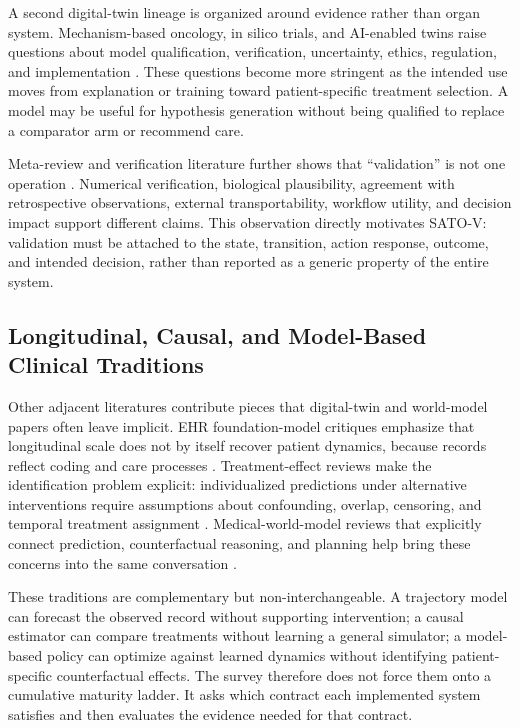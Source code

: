 A second digital-twin lineage is organized around evidence rather than organ system. Mechanism-based oncology, in silico trials, and AI-enabled twins raise questions about model qualification, verification, uncertainty, ethics, regulation, and implementation \citep{Wu2022Integratingmechanismbased,Strigari2025ComputationalNuclearOncology,Alharthi2025AIpoweredsilico,Samei2025FutureSilicoTrials}. These questions become more stringent as the intended use moves from explanation or training toward patient-specific treatment selection. A model may be useful for hypothesis generation without being qualified to replace a comparator arm or recommend care.

Meta-review and verification literature further shows that ``validation'' is not one operation \citep{Ringeval2025AdvancingHealthCare,Sel2025SurveyVerificationValidation,Glinkowski2026DigitalTwinsOrthopedics}. Numerical verification, biological plausibility, agreement with retrospective observations, external transportability, workflow utility, and decision impact support different claims. This observation directly motivates SATO-V: validation must be attached to the state, transition, action response, outcome, and intended decision, rather than reported as a generic property of the entire system.

\subsection{Longitudinal, Causal, and Model-Based Clinical Traditions}

Other adjacent literatures contribute pieces that digital-twin and world-model papers often leave implicit. EHR foundation-model critiques emphasize that longitudinal scale does not by itself recover patient dynamics, because records reflect coding and care processes \citep{Wornow2023shakyfoundationslarge}. Treatment-effect reviews make the identification problem explicit: individualized predictions under alternative interventions require assumptions about confounding, overlap, censoring, and temporal treatment assignment \citep{Bica2020FromRealWorld,Li2024Largepretrained}. Medical-world-model reviews that explicitly connect prediction, counterfactual reasoning, and planning help bring these concerns into the same conversation \citep{Qazi2025BeyondGenerativeAI}.

These traditions are complementary but non-interchangeable. A trajectory model can forecast the observed record without supporting intervention; a causal estimator can compare treatments without learning a general simulator; a model-based policy can optimize against learned dynamics without identifying patient-specific counterfactual effects. The survey therefore does not force them onto a cumulative maturity ladder. It asks which contract each implemented system satisfies and then evaluates the evidence needed for that contract.

